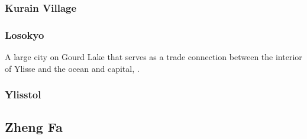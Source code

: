 \subsubsection{Kurain Village}
\label{places:kurain}

\subsubsection{Losokyo}
\label{places:losokyo}
A large city on Gourd Lake that serves as a trade connection between the interior of Ylisse and the ocean and capital, . 

\subsubsection{Ylisstol}
\label{places:ylisstol}

\subsection{Zheng Fa}
\label{nations:zhengfa}